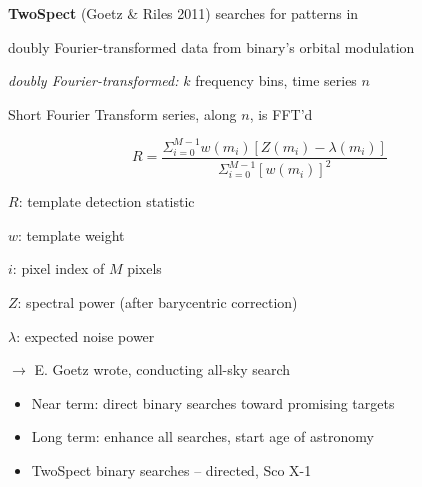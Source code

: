 \textbf{TwoSpect} (Goetz \& Riles 2011) searches for patterns in


doubly Fourier-transformed data from binary's orbital modulation


\emph{doubly Fourier-transformed:} $k$ frequency bins, time series
$n$


Short Fourier Transform series, along $n$, is FFT'd 


\[
R=\frac{\Sigma_{i=0}^{M-1}w(m_{i})[Z(m_{i})-\lambda(m_{i})]}{\Sigma_{i=0}^{M-1}[w(m_{i})]^{2}}
\]



$R$: template detection statistic


$w$: template weight


$i$: pixel index of $M$ pixels


$Z$: spectral power (after barycentric correction)


$\lambda$: expected noise power


$\rightarrow$ E. Goetz wrote, conducting all-sky search




\begin{itemize}
\item Near term: direct binary searches toward promising targets
\item Long term: enhance all searches, start age of astronomy
\item TwoSpect binary searches -- directed, Sco X-1
\end{itemize}



